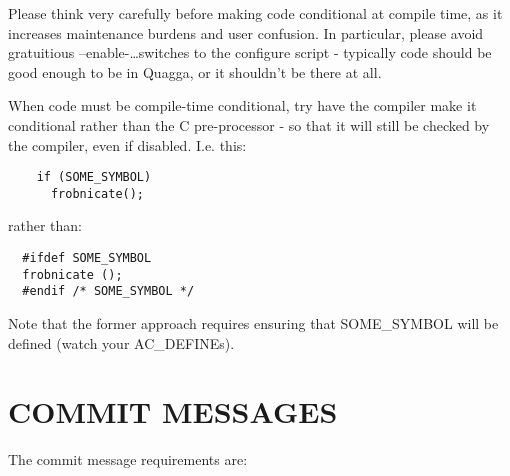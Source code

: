 \documentclass[oneside]{article}
\begin{document}
Please think very carefully before making code conditional at compile time,
as it increases maintenance burdens and user confusion. In particular,
please avoid gratuitious --enable-\ldots switches to the configure script -
typically code should be good enough to be in Quagga, or it shouldn't be
there at all.

When code must be compile-time conditional, try have the compiler make it
conditional rather than the C pre-processor - so that it will still be
checked by the compiler, even if disabled. I.e.  this:

\begin{verbatim}
    if (SOME_SYMBOL)
      frobnicate();
\end{verbatim}

rather than:

\begin{verbatim}
  #ifdef SOME_SYMBOL
  frobnicate ();
  #endif /* SOME_SYMBOL */
\end{verbatim}

Note that the former approach requires ensuring that SOME\_SYMBOL will be
defined (watch your AC\_DEFINEs).


\section{COMMIT MESSAGES}

The commit message requirements are:
\end{document}
